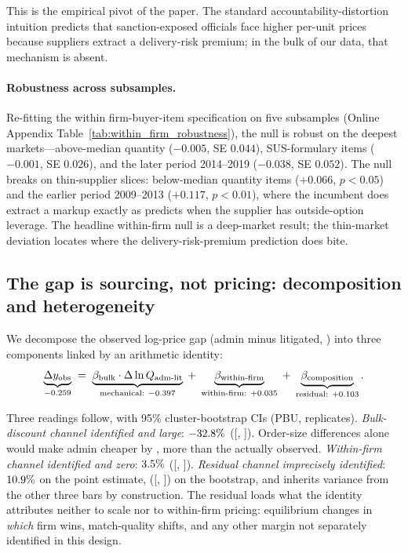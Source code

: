 This is the empirical pivot of the paper. The standard
accountability-distortion intuition
\citep{prendergast2007bureaucrats} predicts that sanction-exposed
officials face higher per-unit prices because suppliers extract a
delivery-risk premium; in the bulk of our data, that mechanism is
absent.

\paragraph{Robustness across subsamples.}
Re-fitting the within firm-buyer-item specification on five
subsamples (Online Appendix Table~\ref{tab:within_firm_robustness}),
the null is robust on the deepest markets---above-median quantity
($-0.005$, SE $0.044$), SUS-formulary items ($-0.001$, SE $0.026$),
and the later period 2014--2019 ($-0.038$, SE $0.052$). The null
breaks on thin-supplier slices: below-median quantity items
($+0.066$, $p<0.05$) and the earlier period 2009--2013
($+0.117$, $p<0.01$), where the incumbent does extract a markup
exactly as \citet{prendergast2007bureaucrats} predicts when the
supplier has outside-option leverage. The headline within-firm null
is a deep-market result; the thin-market deviation locates where
the delivery-risk-premium prediction does bite.

\subsection{The gap is sourcing, not pricing: decomposition and heterogeneity}
\label{sec:reconciliation}

We decompose the observed log-price gap (admin minus litigated,
\BPutgObsLogGap) into three components linked by an arithmetic
identity:
\begin{equation*}
\underbrace{\Delta y_{\text{obs}}}_{-0.259}
\;=\;
\underbrace{\beta_{\text{bulk}} \cdot \Delta \ln Q_{\text{adm-lit}}}_{\text{mechanical: } -0.397}
\;+\;
\underbrace{\beta_{\text{within-firm}}}_{\text{within-firm: } +0.035}
\;+\;
\underbrace{\beta_{\text{composition}}}_{\text{residual: } +0.103}.
\end{equation*}

Three readings follow, with 95\% cluster-bootstrap CIs (PBU,
\BPutgReconBootB{} replicates). \emph{Bulk-discount channel
identified and large}: $-32.8\%$ ([\BPutgMechCIlow,
\BPutgMechCIhigh]). Order-size differences alone would make admin
cheaper by \BPutgMechPctAbs{}, more than the
\BPutgObsPctLitOverAdmin{} actually observed. \emph{Within-firm
channel identified and zero}: $3.5\%$
([\BPutgWithinCIlow, \BPutgWithinCIhigh]). \emph{Residual channel
imprecisely identified}: $10.9\%$ on the point
estimate, ([\BPutgCompCIlow, \BPutgCompCIhigh]) on the bootstrap, and
inherits variance from the other three bars by construction. The
residual loads what the identity attributes neither to scale nor to
within-firm pricing: equilibrium changes in \emph{which} firm wins,
match-quality shifts, and any other margin not separately identified
in this design.

